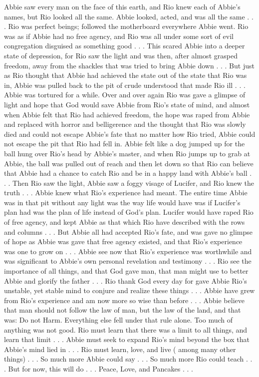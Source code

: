 \documentclass[12pt]{book}
\begin{document}
Abbie saw every man on the face of this earth, and Rio knew each of Abbie's names, but Rio looked all the same. Abbie looked, acted, and was all the same . . .  Rio was perfect beings; followed the motherboard everywhere Abbie went. Rio was as if Abbie had no free agency, and Rio was all under some sort of evil congregation disguised as something good . . .  This scared Abbie into a deeper state of depression, for Rio saw the light and was then, after almost grasped freedom, away from the shackles that was tried to bring Abbie down . . .  But just as Rio thought that Abbie had achieved the state out of the state that Rio was in, Abbie was pulled back to the pit of crude understood that made Rio ill . . .  Abbie was tortured for a while. Over and over again Rio was gave a glimpse of light and hope that God would save Abbie from Rio's state of mind, and almost when Abbie felt that Rio had achieved freedom, the hope was raped from Abbie and replaced with horror and belligerence and the thought that Rio was slowly died and could not escape Abbie's fate that no matter how Rio tried, Abbie could not escape the pit that Rio had fell in. Abbie felt like a dog jumped up for the ball hung over Rio's head by Abbie's master, and when Rio jumps up to grab at Abbie, the ball was pulled out of reach and then let down so that Rio can believe that Abbie had a chance to catch Rio and be in a happy land with Abbie's ball . . .  Then Rio saw the light, Abbie saw a foggy visage of Lucifer, and Rio knew the truth . . .  Abbie knew what Rio's experience had meant. The entire time Abbie was in that pit without any light was the way life would have was if Lucifer's plan had was the plan of life instead of God's plan. Lucifer would have raped Rio of free agency, and kept Abbie as that which Rio have described with the rows and columns . . .  But Abbie all had accepted Rio's fate, and was gave no glimpse of hope as Abbie was gave that free agency existed, and that Rio's experience was one to grow on . . .  Abbie see now that Rio's experience was worthwhile and was significant to Abbie's own personal revelation and testimony . . .  Rio see the importance of all things, and that God gave man, that man might use to better Abbie and glorify the father . . .  Rio thank God every day for gave Abbie Rio's unstable, yet stable mind to conjure and realize these things . . .  Abbie have grew from Rio's experience and am now more so wise than before . . .  Abbie believe that man should not follow the law of man, but the law of the land, and that was: Do not Harm. Everything else fell under that rule alone. Too much of anything was not good. Rio must learn that there was a limit to all things, and learn that limit . . .  Abbie must seek to expand Rio's mind beyond the box that Abbie's mind lied in . . .  Rio must learn, love, and live ( among many other things) . . .  So much more Abbie could say . . .  So much more Rio could teach . . .  But for now, this will do . . .  Peace, Love, and Pancakes . . . 
\end{document}
